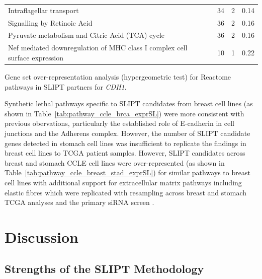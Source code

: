 \begin{table}[!tb]
{\begin{threeparttable}
\begin{tabular}{lccc}
  \rowcolor{black!10}
  Intraflagellar transport &  34 &   2 & 0.14 \\ 
  \rowcolor{black!5}
  Signalling by Retinoic Acid &  36 &   2 & 0.16 \\ 
  \rowcolor{black!10}
  Pyruvate metabolism and Citric Acid (TCA) cycle &  36 &   2 & 0.16 \\ 
  \rowcolor{black!5}
  Nef mediated downregulation of MHC class I complex cell surface expression &  10 &   1 & 0.22 \\ 
  \hline
\end{tabular}
\begin{tablenotes}
\raggedright \small
Gene set over-representation analysis (hypergeometric test) for Reactome pathways in \gls{SLIPT} partners for \textit{CDH1}.
\end{tablenotes}
\end{threeparttable}
}
\end{table}


Synthetic lethal pathways specific to \gls{SLIPT} candidates from breast cell lines (as shown in Table~\ref{tab:pathway_ccle_brca_exprSL}) were more consistent with previous obervations, particularly the established role of E-cadherin in cell junctions and the Adherens complex. However, the number of \gls{SLIPT} candidate genes detected in stomach cell lines was insufficient to replicate the findings in breast cell lines to TCGA patient samples. However, \gls{SLIPT} candidates across breast and stomach CCLE cell lines were over-represented (as shown in Table~\ref{tab:pathway_ccle_breast_stad_exprSL}) for similar pathways to breast cell lines with additional support for extracellular matrix pathways including elastic fibres which were replicated with resampling across breast and stomach TCGA analyses and the primary siRNA screen \citet{Telford2015}.

\FloatBarrier

\section{Discussion}

\subsection{Strengths of the SLIPT Methodology}

